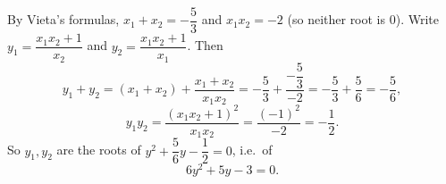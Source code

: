 By Vieta's formulas, $x_1+x_2=-\dfrac{5}{3}$ and $x_1x_2=-2$ (so neither root is $0$). Write $y_1=\dfrac{x_1x_2+1}{x_2}$ and $y_2=\dfrac{x_1x_2+1}{x_1}$. Then
\[
y_1+y_2=(x_1+x_2)+\dfrac{x_1+x_2}{x_1x_2}=-\dfrac{5}{3}+\dfrac{-\dfrac{5}{3}}{-2}=-\dfrac{5}{3}+\dfrac{5}{6}=-\dfrac{5}{6},
\]
\[
y_1y_2=\dfrac{(x_1x_2+1)^2}{x_1x_2}=\dfrac{(-1)^2}{-2}=-\dfrac{1}{2} .
\]
So $y_1,y_2$ are the roots of $y^2+\dfrac{5}{6}y-\dfrac{1}{2}=0$, i.e.\ of
\[
\boxed{6y^2+5y-3=0}.
\]
